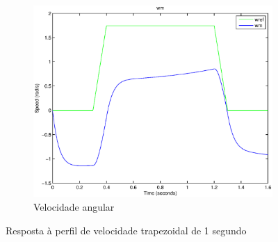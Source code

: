 \documentclass{article}
\begin{document}
\begin{figure}[H]
\begin{subfigure}{0.45\textwidth}
		\includegraphics[width=\linewidth]{matlab/wm7}
		\caption{Velocidade angular}
	\end{subfigure}
	\caption{Resposta à perfil de velocidade trapezoidal de 1 segundo}	
	\label{fig:sim7res}
\end{figure}
\end{document}

